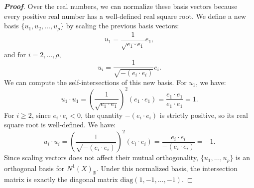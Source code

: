 \begin{proof}[\textbf{Proof}]
Over the real numbers, we can normalize these basis vectors because every positive real number has a well-defined real square root. We define a new basis $\{u_1, u_2, \dots, u_\rho\}$ by scaling the previous basis vectors:
\[
u_1 = \frac{1}{\sqrt{e_1 \cdot e_1}} e_1,
\]
and for $i = 2, \dots, \rho$,
\[
u_i = \frac{1}{\sqrt{-(e_i \cdot e_i)}} e_i.
\]
We can compute the self-intersections of this new basis. For $u_1$, we have:
\[
u_1 \cdot u_1 = \left( \frac{1}{\sqrt{e_1 \cdot e_1}} \right)^2 (e_1 \cdot e_1) = \frac{e_1 \cdot e_1}{e_1 \cdot e_1} = 1.
\]
For $i \geq 2$, since $e_i \cdot e_i < 0$, the quantity $-(e_i \cdot e_i)$ is strictly positive, so its real square root is well-defined. We have:
\[
u_i \cdot u_i = \left( \frac{1}{\sqrt{-(e_i \cdot e_i)}} \right)^2 (e_i \cdot e_i) = \frac{e_i \cdot e_i}{-(e_i \cdot e_i)} = -1.
\]
Since scaling vectors does not affect their mutual orthogonality, $\{u_1, \dots, u_\rho\}$ is an orthogonal basis for $N^1(X)_\mathbb{R}$. Under this normalized basis, the intersection matrix is exactly the diagonal matrix $\text{diag}(1, -1, \dots, -1)$.
\end{proof}